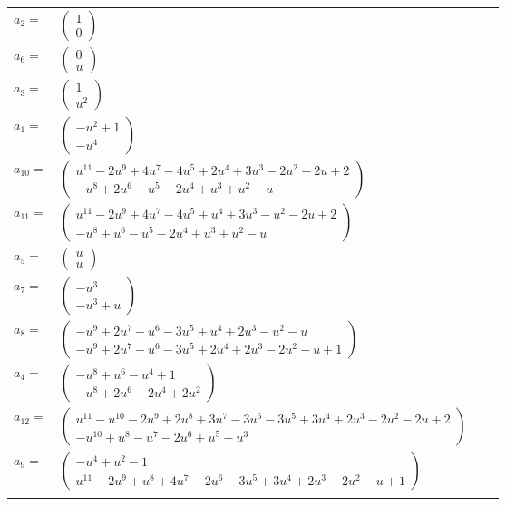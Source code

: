 \documentclass[1p]{elsarticle_modified}
\theoremstyle{definition}
\begin{document}
\begin{tabular}{m{7pt} m{180pt} m{7pt} m{180pt} }
\flushright $a_{2}=$&$\begin{pmatrix}1\\0\end{pmatrix}$ \\
\flushright $a_{6}=$&$\begin{pmatrix}0\\u\end{pmatrix}$ \\
\flushright $a_{3}=$&$\begin{pmatrix}1\\u^2\end{pmatrix}$ \\
\flushright $a_{1}=$&$\begin{pmatrix}- u^2+1\\- u^4\end{pmatrix}$ \\
\flushright $a_{10}=$&$\begin{pmatrix}u^{11}-2 u^9+4 u^7-4 u^5+2 u^4+3 u^3-2 u^2-2 u+2\\- u^8+2 u^6- u^5-2 u^4+u^3+u^2- u\end{pmatrix}$ \\
\flushright $a_{11}=$&$\begin{pmatrix}u^{11}-2 u^9+4 u^7-4 u^5+u^4+3 u^3- u^2-2 u+2\\- u^8+u^6- u^5-2 u^4+u^3+u^2- u\end{pmatrix}$ \\
\flushright $a_{5}=$&$\begin{pmatrix}u\\u\end{pmatrix}$ \\
\flushright $a_{7}=$&$\begin{pmatrix}- u^3\\- u^3+u\end{pmatrix}$ \\
\flushright $a_{8}=$&$\begin{pmatrix}- u^9+2 u^7- u^6-3 u^5+u^4+2 u^3- u^2- u\\- u^9+2 u^7- u^6-3 u^5+2 u^4+2 u^3-2 u^2- u+1\end{pmatrix}$ \\
\flushright $a_{4}=$&$\begin{pmatrix}- u^8+u^6- u^4+1\\- u^8+2 u^6-2 u^4+2 u^2\end{pmatrix}$ \\
\flushright $a_{12}=$&$\begin{pmatrix}u^{11}- u^{10}-2 u^9+2 u^8+3 u^7-3 u^6-3 u^5+3 u^4+2 u^3-2 u^2-2 u+2\\- u^{10}+u^8- u^7-2 u^6+u^5- u^3\end{pmatrix}$ \\
\flushright $a_{9}=$&$\begin{pmatrix}- u^4+u^2-1\\u^{11}-2 u^9+u^8+4 u^7-2 u^6-3 u^5+3 u^4+2 u^3-2 u^2- u+1\end{pmatrix}$\\&\end{tabular}
\end{document}
